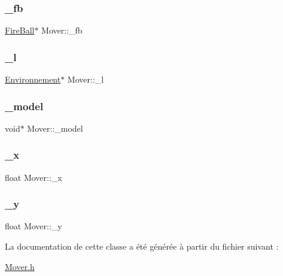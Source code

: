 \subsubsection{\texorpdfstring{\+\_\+fb}{\_fb}}
{\footnotesize\ttfamily \hyperlink{classFireBall}{Fire\+Ball}$\ast$ Mover\+::\+\_\+fb}

\mbox{\label{classMover_abb7d4bee1bba787f98e9c0b23624d914}} 
\subsubsection{\texorpdfstring{\+\_\+l}{\_l}}
{\footnotesize\ttfamily \hyperlink{classEnvironnement}{Environnement}$\ast$ Mover\+::\+\_\+l}

\mbox{\label{classMover_a92885841309ed1f2703fcfe7c56fcf42}} 
\subsubsection{\texorpdfstring{\+\_\+model}{\_model}}
{\footnotesize\ttfamily void$\ast$ Mover\+::\+\_\+model}

\mbox{\label{classMover_aaf143c6da9fb16aa10d041b73107d68b}} 
\subsubsection{\texorpdfstring{\+\_\+x}{\_x}}
{\footnotesize\ttfamily float Mover\+::\+\_\+x}

\mbox{\label{classMover_ab0accef354ef4f78b61404fbc81c1ade}} 
\subsubsection{\texorpdfstring{\+\_\+y}{\_y}}
{\footnotesize\ttfamily float Mover\+::\+\_\+y}



La documentation de cette classe a été générée à partir du fichier suivant \+:\begin{DoxyCompactItemize}
\item 
\hyperlink{Mover_8h}{Mover.\+h}\end{DoxyCompactItemize}
